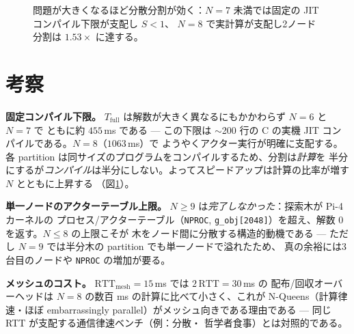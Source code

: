 \documentclass[11pt]{ltjsarticle}
\begin{document}
\begin{figure}[h]\centering
{}
\caption{問題が大きくなるほど分散分割が効く：$N{=}7$ 未満では固定の JIT コンパイル下限が支配し $S<1$、
$N{=}8$ で実計算が支配し2ノード分割は $1.53\times$ に達する。}
\label{fig:speedup}
\end{figure}

\section{考察}
\textbf{固定コンパイル下限。} $T_\mathrm{full}$ は解数が大きく異なるにもかかわらず $N{=}6$ と $N{=}7$ で
ともに約 $455$\,ms である --- この下限は $\sim$200 行の C の実機 JIT コンパイルである。$N{=}8$（$1063$\,ms）で
ようやくアクター実行が明確に支配する。各 partition は同サイズのプログラムをコンパイルするため、分割は\emph{計算}を
半分にするが\emph{コンパイル}は半分にしない。よってスピードアップは計算の比率が増す $N$ とともに上昇する
（図\ref{fig:speedup}）。

\noindent\textbf{単一ノードのアクターテーブル上限。} $N{\ge}9$ は\emph{完了しなかった}：探索木が Pi-4 カーネルの
プロセス/アクターテーブル（\texttt{NPROC}, \texttt{g\_obj[2048]}）を超え、解数 $0$ を返す。$N{\le}8$ の上限こそが
木をノード間に分散する構造的動機である --- ただし $N{=}9$ では半分木の partition でも単一ノードで溢れたため、
真の余裕には3台目のノードや \texttt{NPROC} の増加が要る。

\noindent\textbf{メッシュのコスト。} $\mathrm{RTT_{mesh}}=15$\,ms では $2\,\mathrm{RTT}=30$\,ms の
配布/回収オーバーヘッドは $N{=}8$ の数百 ms の計算に比べて小さく、これが N-Queens（計算律速・ほぼ
embarrassingly parallel）がメッシュ向きである理由である --- 同じ RTT が支配する通信律速ベンチ（例：分散・
哲学者食事）とは対照的である。
\end{document}
